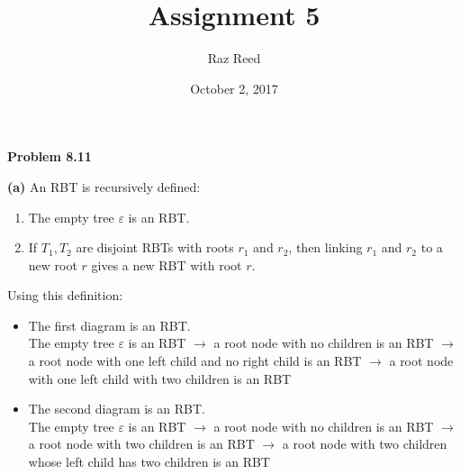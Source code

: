 \documentclass[fleqn]{article}
\title{Assignment 5}
\author{Raz Reed}
\date{October 2, 2017}
\begin{document}
\maketitle

\newpage
{\Large\bf Problem 8.11}\vspace{1em}\par
\textbf{(a)} An RBT is recursively defined:
\begin{enumerate}
	\item The empty tree $\varepsilon$ is an RBT.
	\item If $T_1,T_2$ are disjoint RBTs with roots $r_1$ and $r_2$, then linking $r_1$ and $r_2$ to a new root $r$ gives a new RBT with root $r$.
\end{enumerate}
Using this definition:
\begin{itemize}
	\item The first diagram is an RBT.\\
		  The empty tree $\varepsilon$ is an RBT $\rightarrow$ a root node with no children is an RBT $\rightarrow$ a root node with one left child and no right child is an RBT $\rightarrow$ a root node with one left child with two children is an RBT\par
	\item The second diagram is an RBT.\\
		  The empty tree $\varepsilon$ is an RBT $\rightarrow$ a root node with no children is an RBT $\rightarrow$ a root node with two children is an RBT $\rightarrow$ a root node with two children whose left child has two children is an RBT\par
\end{itemize}
\end{document}
